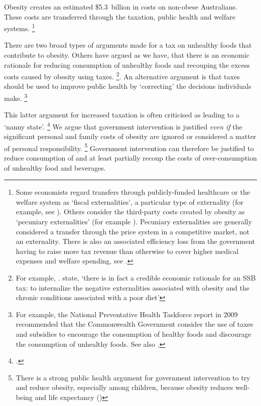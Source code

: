 \documentclass[embargoed]{grattan}
\begin{document}
Obesity creates an estimated \$5.3~billion in costs on non-obese Australians.
These costs are transferred through the taxation, public health and welfare systems.%
\footnote{Some economists regard transfers through publicly-funded healthcare or the welfare system as `fiscal externalities', a particular type of externality (for example, see \mbox{\textcite{Browning1999mythfiscalexternalities}}).
Others consider the third-party costs created by obesity as `pecuniary externalities' (for example \textcite{Commission2010ChildhoodObesityEconomic}).
Pecuniary externalities are generally considered a transfer through the price system in a competitive market, not an externality.
There is also an associated efficiency loss from the government having to raise more tax revenue than otherwise to cover higher medical expenses and welfare spending, see \textcite{Daley2015Propertytaxes}.}

There are two broad types of arguments made for a tax on unhealthy foods that contribute to obesity.
Others have argued as we have, that there is an economic rationale for reducing consumption of unhealthy foods and recouping the excess costs caused by obesity using taxes.%
\footnote{For example, \textcites{Veerman2016ImpactTaxSugar}{Karnani2016ObesityCrisisas}{Cawley2012medicalcarecosts}{Parks2012MarginalExternalCost}. \textcite{Cawley2015IncidenceTaxesSugar} state, `there is in fact a credible economic rationale for an SSB tax: to internalize the negative externalities associated with obesity and the chronic conditions associated with a poor diet'}.
An alternative argument is that taxes should be used to improve public health by `correcting' the decisions individuals make.%
\footnote{For example, the National Preventative Health Taskforce report in 2009 recommended that the Commonwealth Government consider the use of taxes and subsidies to encourage the consumption of healthy foods and discourage the consumption of unhealthy foods.
See also \textcites{Powell2013Assessingpotentialeffectiveness}{Organisation2015Usingpricepolicies}{Thow2014systematicrevieweffectiveness}{Sassi2013rolefiscalpolicies}.}

This latter argument for increased taxation is often criticised as leading to a `nanny state'.%
\footcites{Novak2012Nannystatetaxes}{Keane2016Sugarohhoney}{Lesh2016Greenssoftdrinks}{Elliott2016TomElliottsays} We argue that government intervention is justified \emph{even if} the significant personal and family costs of obesity are ignored or considered a matter of personal responsibility.%
\footnote{There is a strong public health argument for government intervention to try and reduce obesity, especially among children, because obesity reduces well-being and life expectancy (\textcites{Roberto2015Patchyprogressobesity}{Waters2011Interventionspreventingobesity}{Ewart-Pierce2016WholeCommunityObesity})} Government intervention can therefore be justified to reduce consumption of and at least partially recoup the costs of over-consumption of unhealthy food and beverages.
\end{document}
